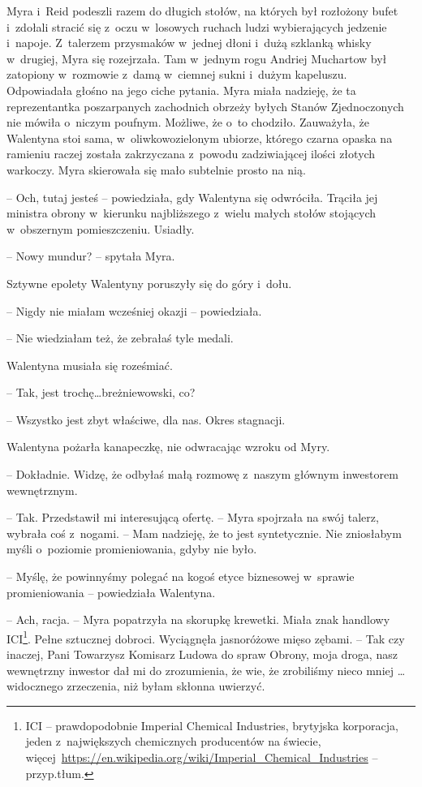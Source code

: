 \documentclass[oneside,polish,11pt,sfheadings]{mwbk}
\begin{document}
Myra i~Reid podeszli razem do długich stołów, na których był rozłożony
bufet i~zdołali stracić się z~oczu w~losowych ruchach ludzi
wybierających jedzenie i~napoje. Z~talerzem przysmaków w~jednej dłoni i~dużą szklanką whisky w~drugiej, Myra się rozejrzała. Tam w~jednym rogu
Andriej Muchartow był zatopiony w~rozmowie z~damą w~ciemnej sukni i~dużym kapeluszu. Odpowiadała głośno na jego ciche pytania. Myra miała
nadzieję, że ta reprezentantka poszarpanych zachodnich obrzeży byłych
Stanów Zjednoczonych nie mówiła o~niczym poufnym. Możliwe, że o~to
chodziło. Zauważyła, że Walentyna stoi sama, w~oliwkowozielonym ubiorze,
którego czarna opaska na ramieniu raczej została zakrzyczana z~powodu
zadziwiającej ilości złotych warkoczy. Myra skierowała się mało
subtelnie prosto na nią.

-- Och, tutaj jesteś -- powiedziała, gdy Walentyna się odwróciła. Trąciła
jej ministra obrony w~kierunku najbliższego z~wielu małych stołów
stojących w~obszernym pomieszczeniu. Usiadły.

-- Nowy mundur? -- spytała Myra.

Sztywne epolety Walentyny poruszyły się do góry i~dołu. 

-- Nigdy nie
miałam wcześniej okazji -- powiedziała.

-- Nie wiedziałam też, że zebrałaś tyle medali.

Walentyna musiała się roześmiać. 

-- Tak, jest trochę\ldots breżniewowski,
co?

-- Wszystko jest zbyt właściwe, dla nas. Okres stagnacji.

Walentyna pożarła kanapeczkę, nie odwracając wzroku od Myry. 

-- Dokładnie. Widzę, że odbyłaś małą rozmowę z~naszym głównym inwestorem
wewnętrznym.

-- Tak. Przedstawił mi interesującą ofertę. -- Myra spojrzała na swój
talerz, wybrała coś z~nogami. -- Mam nadzieję, że to jest syntetycznie.
Nie zniosłabym myśli o~poziomie promieniowania, gdyby nie było.

-- Myślę, że powinnyśmy polegać na kogoś etyce biznesowej w~sprawie
promieniowania -- powiedziała Walentyna.

-- Ach, racja. -- Myra popatrzyła na skorupkę krewetki. Miała znak
handlowy ICI\footnote{ ICI -- prawdopodobnie Imperial Chemical Industries,
brytyjska korporacja, jeden z~największych chemicznych producentów na
świecie,
więcej~\url{https://en.wikipedia.org/wiki/Imperial\_Chemical\_Industries}
-- przyp.tłum.}. Pełne sztucznej dobroci. Wyciągnęła jasnoróżowe mięso
zębami. -- Tak czy inaczej, Pani Towarzysz Komisarz Ludowa do spraw
Obrony, moja droga, nasz wewnętrzny inwestor dał mi do zrozumienia, że
wie, że zrobiliśmy nieco mniej \ldots widocznego zrzeczenia, niż byłam
skłonna uwierzyć.
\end{document}
